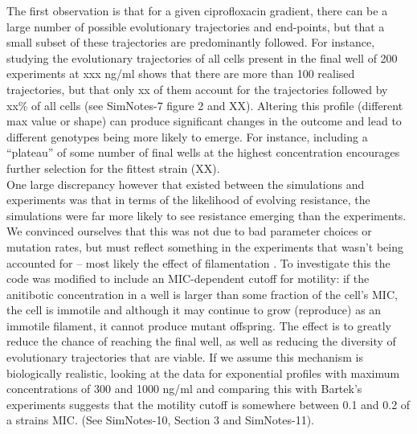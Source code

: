 \documentclass[a4paper,10pt]{article}
\begin{document}
The first observation is that for a given ciprofloxacin gradient, there can be a large number of possible evolutionary trajectories and end-points, but that a small subset
of these trajectories are predominantly followed.
For instance, studying the evolutionary trajectories of all cells present in the final well of 200 experiments at xxx ng/ml shows that there 
are more than 100 realised trajectories, but that only xx of them account for the trajectories followed by xx\% of all cells (see SimNotes-7 figure 2 and XX).
Altering this profile (different max value or shape) can produce significant changes in the outcome and lead to different genotypes being more likely to emerge.
For instance, including a ``plateau'' of some number of final wells at the highest concentration encourages further selection for the fittest strain (XX).\\

One large discrepancy however that existed between the simulations and experiments was that in terms of the likelihood of evolving resistance, the simulations were far more likely 
to see resistance emerging than the experiments. We convinced ourselves that this was not due to bad parameter choices or mutation rates, but must reflect something 
in the experiments that wasn't being accounted for -- most likely the effect of filamentation \cite{}. To investigate this the code was modified to include an MIC-dependent
cutoff for motility: if the anitibotic concentration in a well is larger than some fraction of the cell's MIC, the cell is immotile and although it may continue to
grow (reproduce) as an immotile filament, it cannot produce mutant offspring. The effect is to greatly reduce the chance of reaching the final well, as well as
reducing the diversity of evolutionary trajectories that are viable. If we assume this mechanism is biologically realistic, looking at the data for exponential profiles 
with maximum concentrations of 300 and 1000 ng/ml and comparing this with Bartek's experiments suggests that the motility cutoff is somewhere between 0.1 and 0.2 of a strains MIC.
(See SimNotes-10, Section 3 and SimNotes-11).\\
\end{document}

